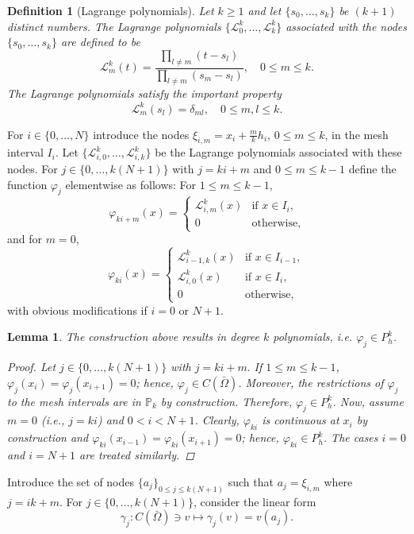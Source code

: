 \documentclass{article}
\newtheorem{definition}{Definition}
\newtheorem{lemma}{Lemma}
\begin{document}
\begin{definition}[Lagrange polynomials]\label{def:lagrangepolynomials}
    Let $k \ge 1$ and let $\{s_0, \dots, s_k\}$ be $(k+1)$ distinct numbers. The Lagrange polynomials $\{\mathcal{L}_0^k, \dots, \mathcal{L}_k^k\}$ associated with the nodes $\{s_0, \dots, s_k\}$ are defined to be
    $$ \mathcal{L}_m^k(t) = \frac{\prod_{l \ne m}(t - s_l)}{\prod_{l \ne m}(s_m - s_l)}, \quad 0 \le m \le k. $$
    The Lagrange polynomials satisfy the important property
    $$ \mathcal{L}_m^k(s_l) = \delta_{ml}, \quad 0 \le m,l \le k. $$
\end{definition}
For $i \in \{0, \dots, N\}$ introduce the nodes $\xi_{i,m} = x_i + \frac{m}{k}h_i$, $0 \le m \le k$, in the mesh interval $I_i$. Let $\{\mathcal{L}_{i,0}^k, \dots, \mathcal{L}_{i,k}^k\}$ be the Lagrange polynomials associated with these nodes. For $j \in \{0, \dots, k(N+1)\}$ with $j = ki + m$ and $0 \le m \le k-1$ define the function $\varphi_j$ elementwise as follows: For $1 \le m \le k-1$,
$$ \varphi_{ki+m}(x) = \begin{cases} \mathcal{L}_{i,m}^k(x) & \text{if } x \in I_i, \\ 0 & \text{otherwise}, \end{cases} $$
and for $m=0$,
$$ \varphi_{ki}(x) = \begin{cases} \mathcal{L}_{i-1,k}^k(x) & \text{if } x \in I_{i-1}, \\ \mathcal{L}_{i,0}^k(x) & \text{if } x \in I_i, \\ 0 & \text{otherwise}, \end{cases} $$
with obvious modifications if $i = 0$ or $N+1$.
\begin{lemma}\label{basis_functions_Pk}
    The construction above results in degree $k$ polynomials, i.e. $\varphi_j \in P_h^k$.
\begin{proof}
    Let $j \in \{0, \dots, k(N+1)\}$ with $j = ki + m.$ If $1 \le m \le k-1$, $\varphi_j(x_i) = \varphi_j(x_{i+1}) = 0$; hence, $\varphi_j \in C(\bar{\Omega})$. Moreover, the restrictions of $\varphi_j$ to the mesh intervals are in $\mathbb{P}_k$ by construction. Therefore, $\varphi_j \in P_h^k$. Now, assume $m = 0$ (i.e., $j=ki$) and $0 < i < N+1$. Clearly, $\varphi_{ki}$ is continuous at $x_i$ by construction and $\varphi_{ki}(x_{i-1}) = \varphi_{ki}(x_{i+1}) = 0$; hence, $\varphi_{ki} \in P_h^k$. The cases $i = 0$ and $i = N+1$ are treated similarly.
\end{proof}
\end{lemma}
Introduce the set of nodes $\{a_j\}_{0 \le j \le k(N+1)}$ such that $a_j = \xi_{i,m}$ where $j = ik + m$. For $j \in \{0, \dots, k(N+1)\}$, consider the linear form
$$ \gamma_j: C(\bar{\Omega}) \ni v \mapsto \gamma_j(v) = v(a_j). $$
\end{document}

